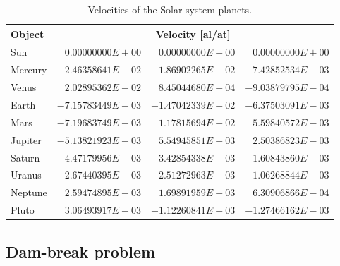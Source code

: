 \documentclass[a4paper,12pt,openany]{book}
\theoremstyle{break}
\begin{document}
\begin{table} [H]
\begin{center}
\caption{Velocities of the Solar system planets.}\label{tbl:solarsystemvel}
\begin{tabular}{ l r r r }
\toprule[1.5pt]
\bf Object & \multicolumn{3}{c}{\bf Velocity [al/at]} \\
\midrule
Sun & $0.00000000E+00$  &  $0.00000000E+00$  &  $0.00000000E+00$ \\
Mercury & $-2.46358641E-02$  &  $-1.86902265E-02$  &  $-7.42852534E-03$ \\
Venus & $2.02895362E-02$  &  $8.45044680E-04$  &  $-9.03879795E-04$ \\
Earth & $-7.15783449E-03$  &  $-1.47042339E-02$  &  $-6.37503091E-03$ \\
Mars & $-7.19683749E-03$  &  $1.17815694E-02$  &  $5.59840572E-03$ \\
Jupiter & $-5.13821923E-03$  &  $5.54945851E-03$  &  $2.50386823E-03$ \\
Saturn & $-4.47179956E-03$  &  $3.42854338E-03$  &  $1.60843860E-03$ \\
Uranus & $2.67440395E-03$  &  $2.51272963E-03$  &  $1.06268844E-03$ \\
Neptune & $2.59474895E-03$  &  $1.69891959E-03$  &  $6.30906866E-04$ \\
Pluto & $3.06493917E-03$  &  $-1.12260841E-03$  &  $-1.27466162E-03$ \\
\bottomrule[1.25pt]
\end{tabular}
\end{center}
\end{table}

\subsection{Dam-break problem}
\end{document}
